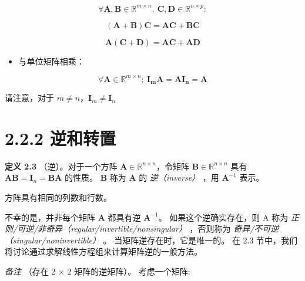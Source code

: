 \begin{equation*}
\forall \boldsymbol {A,B} \in \mathbb{R}^{m \times n}, \ \boldsymbol {C,D} \in \mathbb{R}^{n \times p}:
\end{equation*}

\begin{equation}
(\boldsymbol{A} + \boldsymbol{B})\boldsymbol{C} = \boldsymbol{AC} + \boldsymbol{BC}
\tag{2.19a}\label{eq:2-19a}
\end{equation}

\begin{equation}
\boldsymbol{A} (\boldsymbol{C} + \boldsymbol{D}) = \boldsymbol{AC} + \boldsymbol{AD}
\tag{2.19b}\label{eq:2-19b}
\end{equation}

\begin{itemize}
\item 与单位矩阵相乘：
\end{itemize}

\begin{equation}
\forall \boldsymbol{A} \in \mathbb{R}^{m \times n}: \ \boldsymbol {I_m A} = \boldsymbol {A I_n} = \boldsymbol{A}
\tag{2.20}\label{eq:2-20}
\end{equation}

请注意，对于 $ m \not = n $，$ \boldsymbol{I}_m \not = \boldsymbol{I}_n $

\section*{2.2.2 逆和转置}

\textbf{定义 2.3} （逆）。对于一个方阵 $ \boldsymbol{A} \in \mathbb{R}^{n \times n} $，令矩阵 $ \boldsymbol{B} \in \mathbb{R}^{n \times n} $ 具有 $ \boldsymbol {AB} = \boldsymbol{I}_n = \boldsymbol {BA} $ 的性质。 $ \boldsymbol{B} $ 称为 $ \boldsymbol{A} $ 的 \emph{逆（inverse）} ，用 $ \boldsymbol{A}^{-1} $ 表示。

\begin{notebox}
方阵具有相同的列数和行数。
\end{notebox}

不幸的是，并非每个矩阵 $ \boldsymbol{A} $ 都具有逆 $ \boldsymbol{A}^{-1} $。 如果这个逆确实存在，则 A 称为 \emph{正则/可逆/非奇异（regular/invertible/nonsingular）} ，否则称为 \emph{奇异/不可逆（singular/noninvertible）} 。 当矩阵逆存在时，它是唯一的。 在 2.3 节中，我们将讨论通过求解线性方程组来计算矩阵逆的一般方法。

\emph{备注} （存在 2 × 2 矩阵的逆矩阵）。 考虑一个矩阵:

